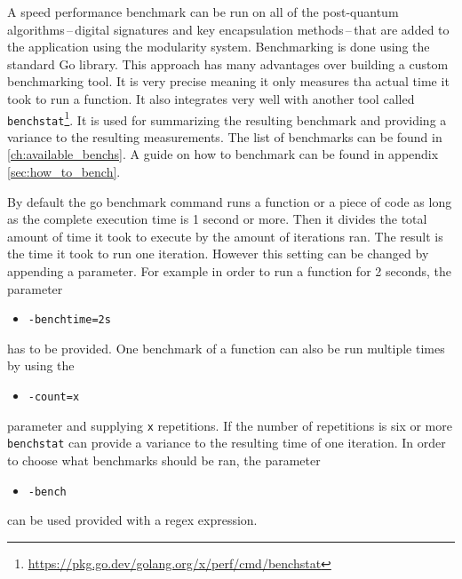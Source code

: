 A speed performance benchmark can be run on all of the post-quantum algorithms\,--\,digital signatures and key encapsulation methods\,--\,that are added to the application using the modularity system. Benchmarking is done using the standard Go library. This approach has many advantages over building a custom benchmarking tool. It is very precise meaning it only measures tha actual time it took to run a function.
It also integrates very well with another tool called \texttt{benchstat}\footnote{\url{https://pkg.go.dev/golang.org/x/perf/cmd/benchstat}}. It is used for summarizing the resulting benchmark and providing a variance to the resulting measurements. The list of benchmarks can be found in \ref{ch:available_benchs}. A guide on how to benchmark can be found in appendix \ref{sec:how_to_bench}.

By default the go benchmark command runs a function or a piece of code as long as the complete execution time is 1 second or more. Then it divides the total amount of time it took to execute by the amount of iterations ran. The result is the time it took to run one iteration. However this setting can be changed by appending a parameter. For example in order to run a function for 2 seconds, the parameter
\begin{itemize}
  \item \texttt{-benchtime=2s}
\end{itemize}
has to be provided. One benchmark of a function can also be run multiple times by using the
\begin{itemize}
  \item \texttt{-count=x}
\end{itemize}
parameter and supplying \texttt{x} repetitions. If the number of repetitions is six or more \texttt{benchstat} can provide a variance to the resulting time of one iteration. In order to choose what benchmarks should be ran, the parameter
\begin{itemize}
  \item \texttt{-bench}
\end{itemize}
can be used provided with a regex expression.
